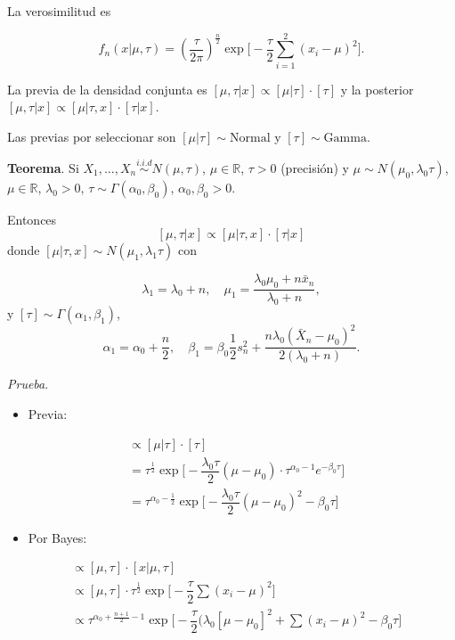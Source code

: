 \documentclass[
  12pt,
]{book}
\providecommand{\tightlist}{%
  \setlength{\itemsep}{0pt}\setlength{\parskip}{0pt}}
\begin{document}
La verosimilitud es

\[f_n(x|\mu,\tau) = \left(\dfrac\tau{2\pi}\right)^{\frac n2}\exp\bigg[-\dfrac\tau2\sum_{i=1}^2(x_i-\mu)^2
\bigg].\]

La previa de la densidad conjunta es \([\mu,\tau|x]\propto [\mu|\tau]\cdot[\tau]\) y la posterior \([\mu,\tau|x] \propto [\mu|\tau,x]\cdot[\tau|x]\).

Las previas por seleccionar son \([\mu|\tau]\sim \text{Normal}\) y \([\tau]\sim\text{Gamma}\).

\textbf{Teorema}. Si \(X_1,\dots,X_n \overset{i.i.d}{\sim} N(\mu,\tau)\), \(\mu \in \mathbb R\), \(\tau>0\) (precisión) y \(\mu\sim N(\mu_0,\lambda_0\tau)\), \(\mu\in\mathbb R\), \(\lambda_0>0\), \(\tau\sim\Gamma(\alpha_0,\beta_0)\), \(\alpha_0,\beta_0>0\).

Entonces
\[[\mu,\tau|x] \propto [\mu|\tau,x]\cdot[\tau|x]\]
donde \([\mu|\tau,x] \sim N(\mu_1,\lambda_1\tau)\) con

\[\lambda_1 = \lambda_0+n, \quad \mu_1 = \dfrac{\lambda_0\mu_0 + n\bar x_n}{\lambda_0+n},\]
y \([\tau] \sim \Gamma(\alpha_1,\beta_1)\),
\[\alpha_1 = \alpha_0+\dfrac n2, \quad \beta_1 = \beta_0  \dfrac 12s_n^2 + \dfrac{n\lambda_0(\bar X_n-\mu_0)^2}{2(\lambda_0+n)}.\]

\emph{Prueba}.

\begin{itemize}
\tightlist
\item
  Previa:
\end{itemize}

\begin{align*}
[\mu,\tau] & \propto [\mu|\tau]\cdot[\tau]\\
& = \tau^{\frac 12}\exp\bigg[-\dfrac{\lambda_0\tau}2(\mu-\mu_0)\cdot \tau^{\alpha_0-1}e^{-\beta_0\tau}\bigg]\\
& = \tau^{\alpha_0-\frac 12}\exp\bigg[-\dfrac{\lambda_0\tau}{2}(\mu-\mu_0)^2 - \beta_0\tau\bigg]
\end{align*}

\begin{itemize}
\tightlist
\item
  Por Bayes:
\end{itemize}

\begin{align*}
[\mu,\tau|x] & \propto [\mu,\tau]\cdot[x|\mu,\tau]\\
& \propto  [\mu,\tau]\cdot\tau^{\frac 12} \exp\bigg[-\dfrac\tau 2\sum(x_i-\mu)^2\bigg]\\
& \propto \tau^{\alpha_0+\frac{n+1}2-1}\exp\bigg[-\dfrac\tau 2(\lambda_0[\mu-\mu_0]^2 + \sum(x_i-\mu)^2-\beta_0\tau\bigg]
\end{align*}
\end{document}
